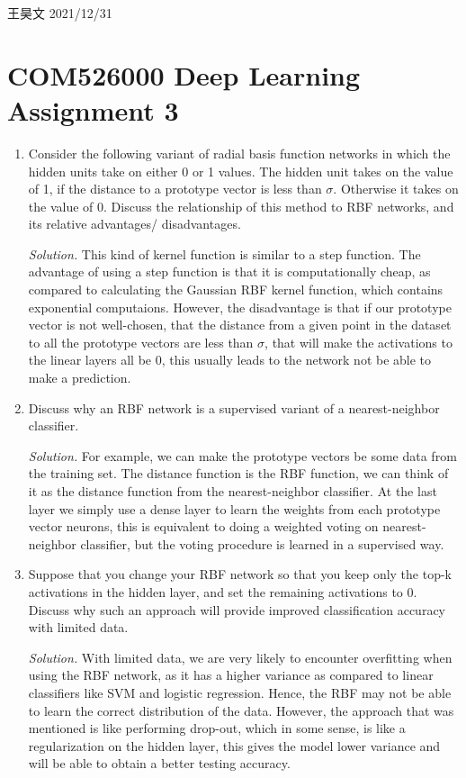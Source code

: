 \documentclass[12pt]{article}
\newcommand\sol[1] {
    \begin{mdframed}
        \emph{Solution.} #1
    \end{mdframed}
}
\begin{document}
 王昊文 \hfill  2021/12/31
\section*{COM526000 Deep Learning Assignment 3}
\begin{enumerate}[ref=\theenumi]
    \item Consider the following variant of radial basis function networks in which the hidden
            units take on either 0 or 1 values. The hidden unit takes on the value of 1, if the
            distance to a prototype vector is less than $\sigma$. Otherwise it takes on the value of 0.
            Discuss the relationship of this method to RBF networks, and its relative advantages/
            disadvantages.
        \sol{
            This kind of kernel function is similar to a step function. The advantage of using
            a step function is that it is computationally cheap, as compared to calculating the 
            Gaussian RBF kernel function, which contains exponential computaions. However, the 
            disadvantage is that if our prototype vector is not well-chosen, that the distance 
            from a given point in the dataset to all the prototype vectors are less than $\sigma$, 
            that will make the activations to the linear layers all be 0, this usually leads to
            the network not be able to make a prediction.
        }
    \item Discuss why an RBF network is a supervised variant of a nearest-neighbor classifier.
        \sol {
            For example, we can make the prototype vectors be some data from the training set.
            The distance function is the RBF function, we can think of it as the distance function
            from the nearest-neighbor classifier. At the last layer we simply use a dense layer
            to learn the weights from each prototype vector neurons, this is equivalent to 
            doing a weighted voting on nearest-neighbor classifier, but the voting procedure
            is learned in a supervised way.
        }
  
    \item Suppose that you change your RBF network so that you keep only the top-k activations
            in the hidden layer, and set the remaining activations to 0. Discuss why such an
            approach will provide improved classification accuracy with limited data.
        \sol {
            With limited data, we are very likely to encounter overfitting when using
            the RBF network, as it has a higher variance as compared to linear classifiers 
            like SVM and logistic regression. Hence, the RBF may not be able to learn the 
            correct distribution of the data. However, the approach that was mentioned
            is like performing drop-out, which in some sense, is like a regularization
            on the hidden layer, this gives the model lower variance and will be able
            to obtain a better testing accuracy.
        }
  

\end{enumerate}
\end{document}
